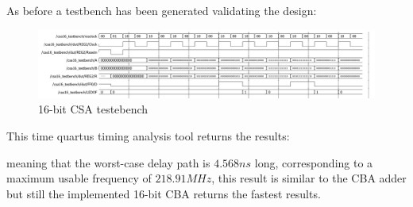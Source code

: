 \documentclass[12pt]{article}
\begin{document}
As before a testbench has been generated validating the design:

\begin{figure}[!h]
	\centering
	\includegraphics[scale = 0.58]{immagini/niki/testbench3.png}
	\caption{16-bit CSA testebench}       
\end{figure}
\newpage

This time quartus timing analysis tool returns the results:
\begin{figure}[!h]
	\centering
	\begin{subfigure}{\linewidth}	
		\centering
	\end{subfigure}
	
\end{figure}

meaning that the worst-case delay path is $4.568 ns $ long, corresponding to a maximum usable frequency of $218.91MHz$,
this result is similar to the CBA adder but still the implemented 16-bit CBA returns the fastest results.
\end{document}
